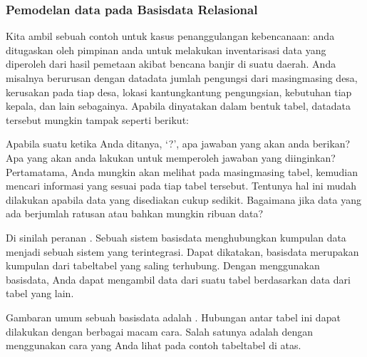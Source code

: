 \documentclass[letterpaper,10pt,english]{sphinxmanual}
\begin{document}
\subsubsection{Pemodelan data pada Basisdata Relasional}
\label{\detokenize{sesi2/relationaldb:pemodelan-data-pada-basisdata-relasional}}
Kita ambil sebuah contoh untuk kasus penanggulangan kebencanaan: anda ditugaskan oleh pimpinan anda untuk melakukan inventarisasi data yang diperoleh dari hasil pemetaan akibat bencana banjir di suatu daerah. Anda misalnya berurusan dengan data\sphinxhyphen{}data jumlah pengungsi dari masing\sphinxhyphen{}masing desa, kerusakan pada tiap desa, lokasi kantung\sphinxhyphen{}kantung pengungsian, kebutuhan tiap kepala, dan lain sebagainya. Apabila dinyatakan dalam bentuk tabel, data\sphinxhyphen{}data tersebut mungkin tampak seperti berikut:



Apabila suatu ketika Anda ditanya, ‘?’, apa jawaban yang akan anda berikan? Apa yang akan anda lakukan untuk memperoleh jawaban yang diinginkan?	
Pertama\sphinxhyphen{}tama, Anda mungkin akan melihat pada masing\sphinxhyphen{}masing tabel, kemudian mencari informasi yang sesuai pada tiap tabel tersebut. Tentunya hal ini mudah dilakukan apabila data yang disediakan cukup sedikit. Bagaimana jika data yang ada berjumlah ratusan atau bahkan mungkin ribuan data?

Di sinilah peranan . Sebuah sistem basisdata menghubungkan kumpulan data menjadi sebuah sistem yang terintegrasi. Dapat dikatakan, basisdata merupakan kumpulan dari tabel\sphinxhyphen{}tabel yang saling terhubung. Dengan menggunakan basisdata, Anda dapat mengambil data dari suatu tabel berdasarkan data dari tabel yang lain.

Gambaran umum sebuah basisdata adalah . Hubungan antar tabel ini dapat dilakukan dengan berbagai macam cara. Salah satunya adalah dengan menggunakan cara yang Anda lihat pada contoh tabel\sphinxhyphen{}tabel di atas.
\end{document}
